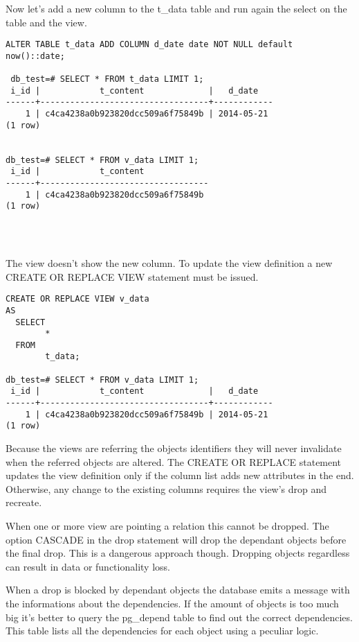 Now let's add a new column to the t\_data table and run again the select on the 
table and the view.

\begin{lstlisting}[style=pgsql]
 ALTER TABLE t_data ADD COLUMN d_date date NOT NULL default now()::date;
 
 db_test=# SELECT * FROM t_data LIMIT 1;
 i_id |            t_content             |   d_date   
------+----------------------------------+------------
    1 | c4ca4238a0b923820dcc509a6f75849b | 2014-05-21
(1 row)


db_test=# SELECT * FROM v_data LIMIT 1;
 i_id |            t_content             
------+----------------------------------
    1 | c4ca4238a0b923820dcc509a6f75849b
(1 row)


 
\end{lstlisting}

The view doesn't show the new column. To update the view definition a new 
CREATE OR REPLACE VIEW statement must be issued.

\begin{lstlisting}[style=pgsql]
 CREATE OR REPLACE VIEW v_data 
AS 
  SELECT 
        *
  FROM 
        t_data;
        
db_test=# SELECT * FROM v_data LIMIT 1;
 i_id |            t_content             |   d_date   
------+----------------------------------+------------
    1 | c4ca4238a0b923820dcc509a6f75849b | 2014-05-21
(1 row)

\end{lstlisting}

Because the views are referring the objects identifiers they will never 
invalidate when the referred objects are altered. 
The CREATE OR REPLACE statement updates the view definition only if the column 
list adds new attributes in the end. 
Otherwise, any change to the existing columns requires the view's drop and 
recreate. 

When one or more view are pointing a relation this cannot be dropped. 
The option CASCADE in the drop statement will drop the dependant objects before 
the final drop. This is a dangerous approach though. Dropping objects 
regardless can result in data or functionality loss.

When a drop is blocked by dependant objects the database emits a message with 
the informations about the dependencies. If the amount of objects is too much 
big it's better to query the pg\_depend table to find out the correct 
dependencies. This table lists all the dependencies for each object using a 
peculiar logic.


